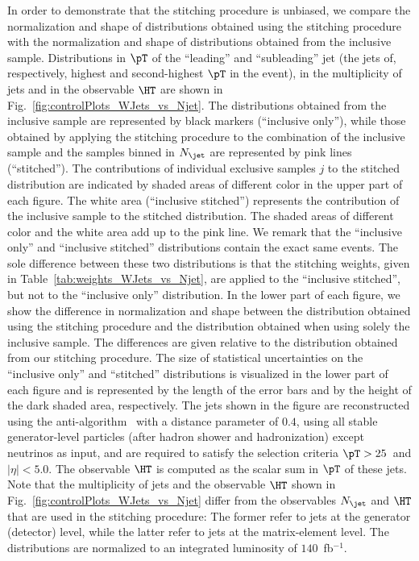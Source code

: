 In order to demonstrate that the stitching procedure is unbiased,
we compare the normalization and shape of distributions obtained using the stitching procedure with the normalization and shape of distributions obtained from the inclusive sample.
Distributions in $\pT$ of the ``leading'' and ``subleading'' jet (the jets of, respectively, highest and second-highest $\pT$ in the event),
in the multiplicity of jets and in the observable $\HT$ are shown in Fig.~\ref{fig:controlPlots_WJets_vs_Njet}.
The distributions obtained from the inclusive sample are represented by black markers (``inclusive only''),
while those obtained by applying the stitching procedure to the combination of the inclusive sample and the samples binned in $N_{\jet}$ are represented by pink lines (``stitched'').
The contributions of individual exclusive samples $j$ to the stitched distribution are indicated by shaded areas of different color in the upper part of each figure.
The white area (``inclusive stitched'') represents the contribution of the inclusive sample to the stitched distribution.
The shaded areas of different color and the white area add up to the pink line.
We remark that the ``inclusive only'' and ``inclusive stitched'' distributions contain the exact same events. 
The sole difference between these two distributions 
is that the stitching weights, given in Table~\ref{tab:weights_WJets_vs_Njet},
are applied to the ``inclusive stitched'', but not to the ``inclusive only'' distribution.
In the lower part of each figure, we show the difference in normalization and shape between the distribution obtained using the stitching procedure
and the distribution obtained when using solely the inclusive sample.
The differences are given relative to the distribution obtained from our stitching procedure.
The size of statistical uncertainties on the ``inclusive only'' and ``stitched'' distributions
is visualized in the lower part of each figure and is represented by the length of the error bars and by the height of the dark shaded area, respectively.
The jets shown in the figure are reconstructed using the anti-\kt algorithm~\cite{Cacciari:2008gp,Cacciari:2011ma} with a distance parameter of $0.4$,
using all stable generator-level particles (after hadron shower and hadronization) except neutrinos as input, and are required to satisfy the selection criteria $\pT > 25$~\GeV and $\vert\eta\vert < 5.0$.
The observable $\HT$ is computed as the scalar sum in $\pT$ of these jets.
Note that the multiplicity of jets and the observable $\HT$ shown in Fig.~\ref{fig:controlPlots_WJets_vs_Njet} 
differ from the observables $N_{\jet}$ and $\HT$ that are used in the stitching procedure:
The former refer to jets at the generator (detector) level, while the latter refer to jets at the matrix-element level.
The distributions are normalized to an integrated luminosity of $140$~fb$^{-1}$.

